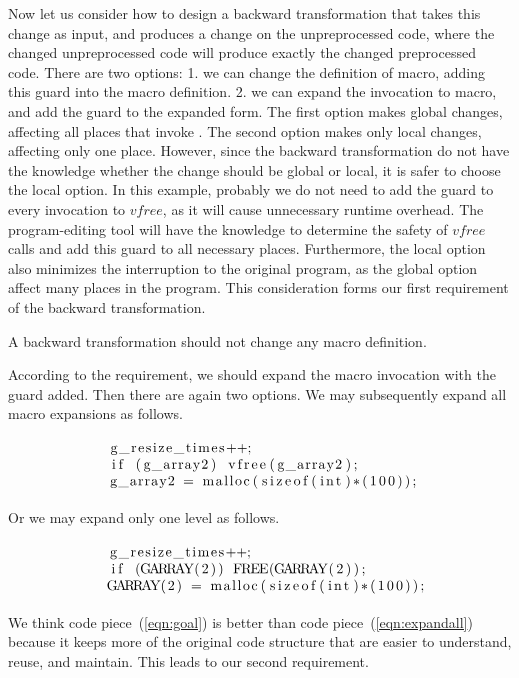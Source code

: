 Now let us consider how to design a backward transformation that takes
this change as input, and produces a change on the unpreprocessed code,
where the changed unpreprocessed code will produce exactly the changed
preprocessed code. There are two options: 1. we can change the definition of
 macro, adding this guard into the macro definition.
2. we can expand the invocation to  macro, and add
the guard to the expanded form. The first option makes global changes,
affecting all places that invoke . The second option
makes only local changes, affecting only one place. However, since
the backward transformation do not have the knowledge whether the change should be
global or local, it is safer to choose the local option. In this example,
probably we do not need to add the guard to every invocation to
$vfree$, as it will cause unnecessary runtime overhead. The
program-editing tool will have the knowledge to determine the safety
of $vfree$ calls and add this guard to all necessary places.
Furthermore,
the local option also minimizes the interruption to the original
program, as the global option affect many places in the program. This consideration forms our first requirement of the
backward transformation.

\begin{decision}
A backward transformation should not change any macro definition.
\end{decision}

According to the requirement, we should expand the macro
invocation with the guard added. Then there are again two
options. We may subsequently expand all macro expansions as follows.
\begin{equation}
\begin{minipage}{7.6cm}
\begin{lstlisting}
g_resize_times++;
if (g_array2) vfree(g_array2);
g_array2 = malloc(sizeof(int)*(100));
\end{lstlisting}
\end{minipage}
\label{eqn:expandall}
\end{equation}
Or we may expand only one level as follows.
\begin{equation}
\begin{minipage}{7.6cm}
\begin{lstlisting}
g_resize_times++;
if (GARRAY(2)) FREE(GARRAY(2));
GARRAY(2) = malloc(sizeof(int)*(100));
\end{lstlisting}
\end{minipage}
\label{eqn:goal}
\end{equation}
\newcommand{\coderef}[1]{code piece~(\ref{#1})}
We think \coderef{eqn:goal} is better than \coderef{eqn:expandall} because it
keeps more of the original code structure that are easier to understand, reuse, and maintain. This leads to our second
requirement.

